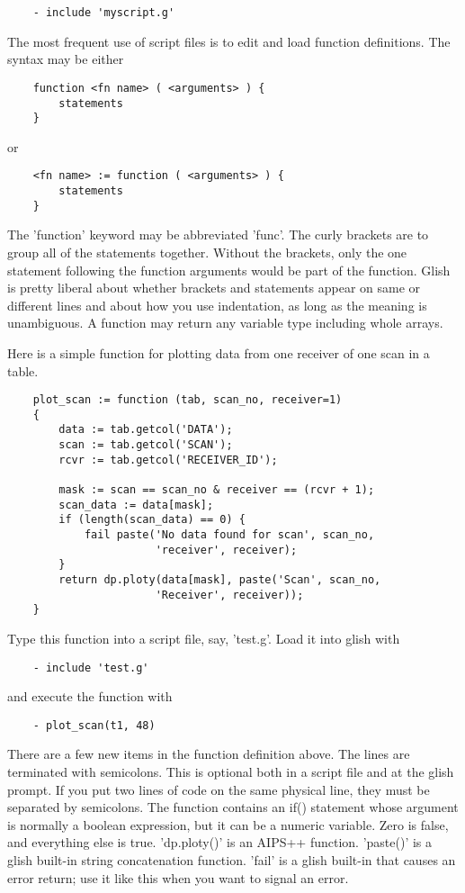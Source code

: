 \begin{verbatim}
	- include 'myscript.g'
\end{verbatim}

The most frequent use of script files is to edit and load function
definitions.  The syntax may be either

\begin{verbatim}
	function <fn name> ( <arguments> ) {
	    statements
	}
\end{verbatim}
or
\begin{verbatim}
	<fn name> := function ( <arguments> ) {
	    statements
	}
\end{verbatim}

The 'function' keyword may be abbreviated 'func'.  The curly brackets are
to group all of the statements together.  Without the brackets, only the
one statement following the function arguments would be part of the
function.  Glish is pretty liberal about whether brackets and statements
appear on same or different lines and about how you use indentation, as
long as the meaning is unambiguous.  A function may return any variable
type including whole arrays.

    Here is a simple function for plotting data from one receiver of one
scan in a table.

\begin{verbatim}
	plot_scan := function (tab, scan_no, receiver=1)
	{
	    data := tab.getcol('DATA');
	    scan := tab.getcol('SCAN');
	    rcvr := tab.getcol('RECEIVER_ID');

	    mask := scan == scan_no & receiver == (rcvr + 1);
	    scan_data := data[mask];
	    if (length(scan_data) == 0) {
	        fail paste('No data found for scan', scan_no, 
	                   'receiver', receiver);
	    }
	    return dp.ploty(data[mask], paste('Scan', scan_no, 
	                   'Receiver', receiver));
	}
\end{verbatim}

Type this function into a script file, say, 'test.g'.  Load it into glish
with

\begin{verbatim}
	- include 'test.g'
\end{verbatim}

and execute the function with

\begin{verbatim}
	- plot_scan(t1, 48)
\end{verbatim}

    There are a few new items in the function definition above.  The lines
are terminated with semicolons.  This is optional both in a script file and
at the glish prompt.  If you put two lines of code on the same physical
line, they must be separated by semicolons.  The function contains an if()
statement whose argument is normally a boolean expression, but it can be a
numeric variable.  Zero is false, and everything else is true.  'dp.ploty()'
is an AIPS++ function.  'paste()' is a glish built-in string concatenation
function. 'fail' is a glish built-in that causes an error return; use
it like this when you want to signal an error.

